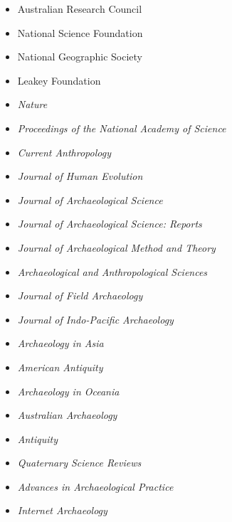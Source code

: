 \begin{itemize}[noitemsep, font=$\bullet$\scshape\bfseries]

\item  Australian Research Council

\item  National Science Foundation

\item  National Geographic Society

\item  Leakey Foundation

\item  \textit{Nature}

\item  \textit{Proceedings of the National Academy of Science}

\item  \textit{Current Anthropology}

\item  \textit{Journal of Human Evolution}

\item  \textit{Journal of Archaeological Science}

\item  \textit{Journal of Archaeological Science: Reports}

\item  \textit{Journal of Archaeological Method and Theory}

\item  \textit{Archaeological and Anthropological Sciences}

\item  \textit{Journal of Field Archaeology}

\item  \textit{Journal of Indo-Pacific Archaeology}

\item  \textit{Archaeology in Asia}

\item  \textit{American Antiquity}

\item  \textit{Archaeology in Oceania}

\item  \textit{Australian Archaeology}

\item  \textit{Antiquity}

\item  \textit{Quaternary Science Reviews}

\item  \textit{Advances in Archaeological Practice}

\item  \textit{Internet Archaeology}

\end{itemize}
